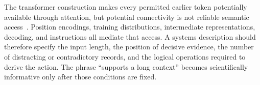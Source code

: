The transformer construction makes every permitted earlier token potentially available through attention, but potential connectivity is not reliable semantic access~\cite{vaswani2017attention}. Position encodings, training distributions, intermediate representations, decoding, and instructions all mediate that access. A systems description should therefore specify the input length, the position of decisive evidence, the number of distracting or contradictory records, and the logical operations required to derive the action. The phrase ``supports a long context'' becomes scientifically informative only after those conditions are fixed.

